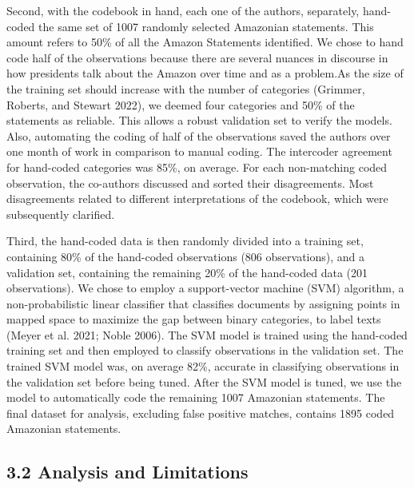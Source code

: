\documentclass[
  12pt,
]{article}
\begin{document}
Second, with the codebook in hand, each one of the authors, separately,
hand-coded the same set of 1007 randomly selected Amazonian statements.
This amount refers to 50\% of all the Amazon Statements identified. We
chose to hand code half of the observations because there are several
nuances in discourse in how presidents talk about the Amazon over time
and as a problem.As the size of the training set should increase with
the number of categories (Grimmer, Roberts, and Stewart 2022), we deemed
four categories and 50\% of the statements as reliable. This allows a
robust validation set to verify the models. Also, automating the coding
of half of the observations saved the authors over one month of work in
comparison to manual coding. The intercoder agreement for hand-coded
categories was 85\%, on average. For each non-matching coded
observation, the co-authors discussed and sorted their disagreements.
Most disagreements related to different interpretations of the codebook,
which were subsequently clarified.

Third, the hand-coded data is then randomly divided into a training set,
containing 80\% of the hand-coded observations (806 observations), and a
validation set, containing the remaining 20\% of the hand-coded data
(201 observations). We chose to employ a support-vector machine (SVM)
algorithm, a non-probabilistic linear classifier that classifies
documents by assigning points in mapped space to maximize the gap
between binary categories, to label texts (Meyer et al. 2021; Noble
2006). The SVM model is trained using the hand-coded training set and
then employed to classify observations in the validation set. The
trained SVM model was, on average 82\%, accurate in classifying
observations in the validation set before being tuned. After the SVM
model is tuned, we use the model to automatically code the remaining
1007 Amazonian statements. The final dataset for analysis, excluding
false positive matches, contains 1895 coded Amazonian statements.

\hypertarget{analysis-and-limitations}{%
\subsection{3.2 Analysis and
Limitations}\label{analysis-and-limitations}}
\end{document}
